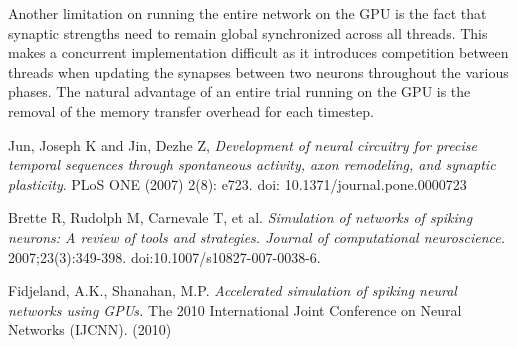 \documentclass[a4paper]{article}
\begin{document}
Another limitation on running the entire network on the GPU is the fact that synaptic strengths need to remain global synchronized across all threads. This makes a concurrent implementation difficult as it introduces competition between threads when updating the synapses between two neurons throughout the various phases. The natural advantage of an entire trial running on the GPU is the removal of the memory transfer overhead for each timestep.



\begin{thebibliography}{9}
Jun, Joseph K and Jin, Dezhe Z,
\emph{Development of neural circuitry for precise temporal sequences through spontaneous activity, axon remodeling, and synaptic plasticity}.
PLoS ONE (2007) 2(8): e723. doi: 10.1371/journal.pone.0000723

Brette R, Rudolph M, Carnevale T, et al.
\emph{Simulation of networks of spiking neurons: A review of tools and strategies. Journal of computational neuroscience.}
2007;23(3):349-398. doi:10.1007/s10827-007-0038-6.

Fidjeland, A.K.,  Shanahan, M.P.
\emph{Accelerated simulation of spiking neural networks using GPUs.}
The 2010 International Joint Conference on Neural Networks (IJCNN). (2010)
\end{thebibliography}
\end{document}
